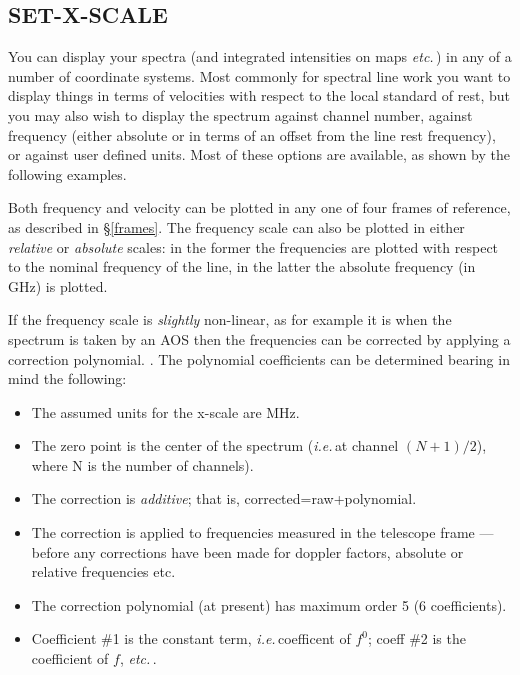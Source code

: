 \documentclass[11pt,twoside]{report}
\newcommand{\etc}{{\it etc.\,}}
\newcommand{\ghz}{{\rm\,GHz}}
\newcommand{\ie}{{\it i.e.\,}}
\begin{document}
\subsection{SET-X-SCALE} 

You can display your spectra (and integrated intensities on maps \etc) in 
any of a number of coordinate systems. Most commonly for spectral line
work you want to display things in terms of velocities with respect to
the local standard of rest, but you may also wish to display the spectrum
against channel number, against frequency (either absolute or in terms of
an offset from the line rest frequency), or against user defined units.
Most of these options are available, as shown by the following examples.

Both frequency and velocity can be plotted in any one of four frames of
reference, as described in \S\ref{frames}.
The frequency scale can also be plotted in either {\em relative} or 
{\em absolute} scales: in the former the frequencies are plotted with
respect to the nominal frequency of the line, in the latter the absolute
frequency (in \ghz) is plotted.

If the frequency scale is {\em slightly} non-linear, as for example it is
when the spectrum is taken by an AOS
then the frequencies can be corrected by applying a correction polynomial.
. The polynomial coefficients can be
determined bearing in mind the following:
\begin{itemize}
\item The assumed units for the x-scale are MHz.
\item The zero point is the center of the spectrum (\ie at channel $(N+1)/2$),
      where N is the number of channels).
\item The correction is {\em additive}; that is, corrected=raw+polynomial.
\item The correction is applied to frequencies measured in the telescope
      frame --- before any corrections have been made for doppler factors,
      absolute or relative frequencies etc.
\item The correction polynomial (at present) has maximum order 5
      (6 coefficients).
\item Coefficient \#1 is the constant term, \ie coefficent of $f^0$; coeff
      \#2 is the coefficient of $f$, \etc.
\end{itemize}
\end{document}
